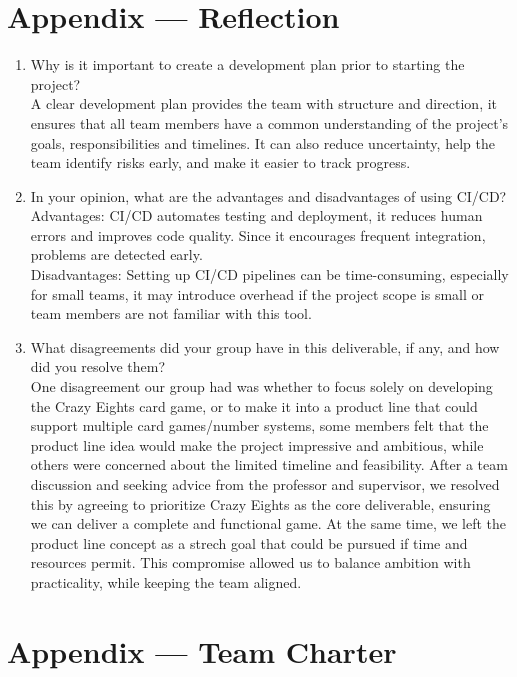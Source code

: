 \documentclass{article}
\begin{document}
\newpage{}

\section*{Appendix --- Reflection}


\begin{enumerate}
    \item Why is it important to create a development plan prior to starting the
    project?\\ A clear development plan provides the team with structure and direction, it ensures that all team members have a common understanding of the project's goals, responsibilities and timelines. It can also reduce uncertainty, help the team identify risks early, and make it easier to track progress.
    \item In your opinion, what are the advantages and disadvantages of using
    CI/CD?\\ Advantages: CI/CD automates testing and deployment,  it reduces human errors and improves code quality.  Since it encourages frequent integration, problems are detected early. \\Disadvantages: Setting up CI/CD pipelines can be time-consuming, especially for small teams, it may introduce overhead if the project scope is small or team members are not familiar with this tool.
    \item What disagreements did your group have in this deliverable, if any,
    and how did you resolve them?\\One disagreement our group had was whether to focus solely on developing the Crazy Eights card game, or to make it into a product line that could support multiple card games/number systems,  some members felt that the product line idea would make the project impressive and ambitious, while others were concerned about the limited timeline and feasibility. After a team discussion and seeking advice from the professor and supervisor, we resolved this by agreeing to prioritize Crazy Eights as the core deliverable, ensuring we can deliver a complete and functional game. At the same time, we left the product line concept as a strech goal that could be pursued if time and resources permit. This compromise allowed us to balance ambition with practicality, while keeping the team aligned.
\end{enumerate}

\newpage{}

\section*{Appendix --- Team Charter}
\end{document}

